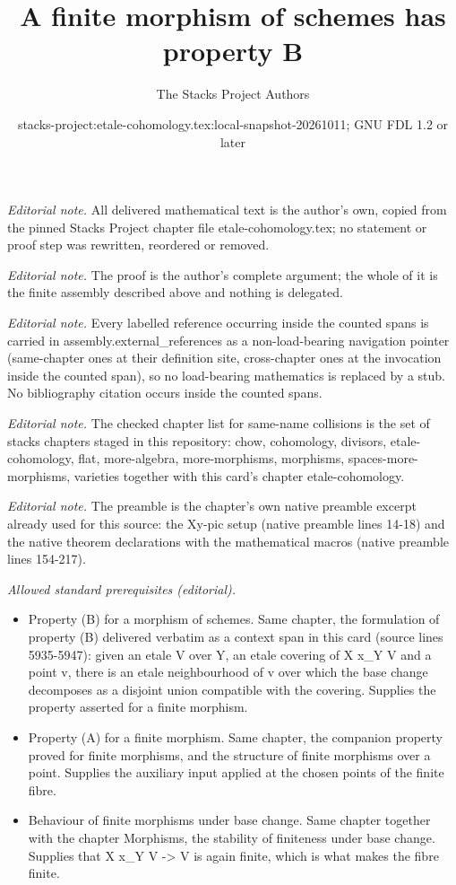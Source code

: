 \documentclass[10pt,a4paper]{amsart}
\title{A finite morphism of schemes has property B}
\author{The Stacks Project Authors}
\date{stacks-project:etale-cohomology.tex:local-snapshot-20261011; GNU FDL 1.2 or later}
\theoremstyle{plain}
\theoremstyle{definition}
\theoremstyle{remark}
\numberwithin{equation}{subsection}
\begin{document}
\maketitle
\noindent\textit{Editorial note.} All delivered mathematical text is the author's own, copied from the pinned Stacks Project chapter file etale-cohomology.tex; no statement or proof step was rewritten, reordered or removed.\par\medskip
\noindent\textit{Editorial note.} The proof is the author's complete argument; the whole of it is the finite assembly described above and nothing is delegated.\par\medskip
\noindent\textit{Editorial note.} Every labelled reference occurring inside the counted spans is carried in assembly.external\_references as a non-load-bearing navigation pointer (same-chapter ones at their definition site, cross-chapter ones at the invocation inside the counted span), so no load-bearing mathematics is replaced by a stub. No bibliography citation occurs inside the counted spans.\par\medskip
\noindent\textit{Editorial note.} The checked chapter list for same-name collisions is the set of stacks chapters staged in this repository: chow, cohomology, divisors, etale-cohomology, flat, more-algebra, more-morphisms, morphisms, spaces-more-morphisms, varieties together with this card's chapter etale-cohomology.\par\medskip
\noindent\textit{Editorial note.} The preamble is the chapter's own native preamble excerpt already used for this source: the Xy-pic setup (native preamble lines 14-18) and the native theorem declarations with the mathematical macros (native preamble lines 154-217).\par\medskip
\noindent\textit{Allowed standard prerequisites (editorial).}\begin{itemize}
\item Property (B) for a morphism of schemes. Same chapter, the formulation of property (B) delivered verbatim as a context span in this card (source lines 5935-5947): given an etale V over Y, an etale covering of X x\_Y V and a point v, there is an etale neighbourhood of v over which the base change decomposes as a disjoint union compatible with the covering. Supplies the property asserted for a finite morphism.
\item Property (A) for a finite morphism. Same chapter, the companion property proved for finite morphisms, and the structure of finite morphisms over a point. Supplies the auxiliary input applied at the chosen points of the finite fibre.
\item Behaviour of finite morphisms under base change. Same chapter together with the chapter Morphisms, the stability of finiteness under base change. Supplies that X x\_Y V -> V is again finite, which is what makes the fibre finite.
\end{itemize}\medskip
\end{document}
